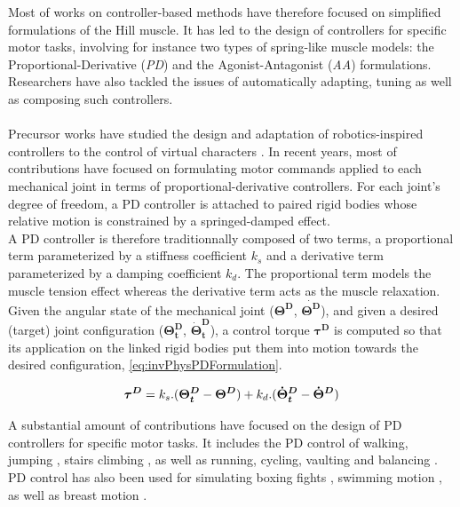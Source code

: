 Most of works on controller-based methods have therefore focused on simplified formulations of the Hill muscle. It has led to the design of controllers for specific motor tasks, involving for instance two types of spring-like muscle models: the Proportional-Derivative (\emph{PD}) and the Agonist-Antagonist (\emph{AA}) formulations. Researchers have also tackled the issues of automatically adapting, tuning as well as composing such controllers.\\


					\\

Precursor works have studied the design and adaptation of robotics-inspired controllers to the control of virtual characters . In recent years, most of contributions have focused on formulating motor commands applied to each mechanical joint in terms of proportional-derivative controllers. For each joint's degree of freedom, a PD controller is attached to paired rigid bodies whose relative motion is constrained by a springed-damped effect.\\

A PD controller is therefore traditionnally composed of two terms, a proportional term parameterized by a stiffness coefficient $k_s$ and a derivative term parameterized by a damping coefficient $k_d$. The proportional term models the muscle tension effect whereas the derivative term acts as the muscle relaxation. Given the angular state of the mechanical joint ($\boldsymbol{\Theta^D}$, $\boldsymbol{\dot{\Theta^D}}$), and given a desired (target) joint configuration ($\boldsymbol{\Theta^D_t}$, $\boldsymbol{\dot{\Theta}^D_t}$), a control torque $\boldsymbol{\tau^D}$ is computed so that its application on the linked rigid bodies put them into motion towards the desired configuration, \myequname \eqref{eq:invPhysPDFormulation}.

\begin{equation}
	\boldsymbol{\tau^D} = k_s . (\boldsymbol{\Theta^D_t} - \boldsymbol{\Theta^D}) + k_d . (\boldsymbol{\dot{\Theta}^D_t} - \boldsymbol{\dot{\Theta}^D})
\label{eq:invPhysPDFormulation}
\eqcaption{\emph{PD} control formulation}
\end{equation}

A substantial amount of contributions have focused on the design of PD controllers for specific motor tasks. It includes the PD control of walking, jumping , stairs climbing , as well as running, cycling, vaulting and balancing . PD control has also been used for simulating boxing fights , swimming motion , as well as breast motion .\\

